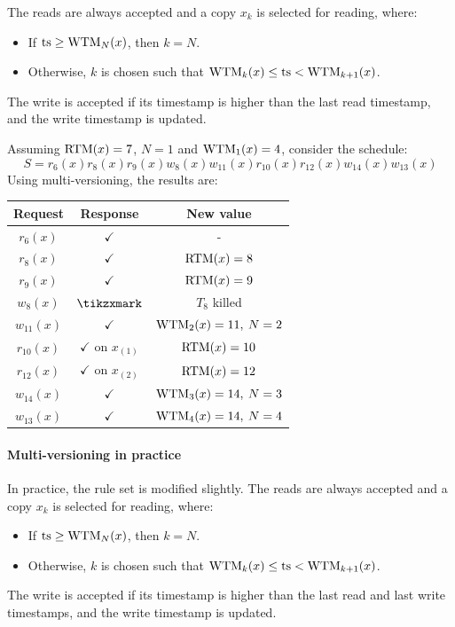 The reads are always accepted and a copy $x_k$ is selected for reading, where:
\begin{itemize}
    \item If $\textnormal{ts} \geq \textnormal{WTM}_N(x)$, then $k=N$.
    \item Otherwise, $k$ is chosen such that $\textnormal{WTM}_k(x) \leq \textnormal{ts} < \textnormal{WTM}_{k+1}(x)$. 
\end{itemize}
The write is accepted if its timestamp is higher than the last read timestamp, and the write timestamp is updated. 

\begin{example}
    Assuming  $\textnormal{RTM}(x)=7$, $N=1$ and $\textnormal{WTM}_1(x)=4$, consider the schedule:
    \[S=r_6(x) r_8(x) r_9(x) w_8(x) w_{11}(x) r_{10}(x) r_{12}(x) w_{14}(x) w_{13}(x)\]
    Using multi-versioning, the results are:
    \begin{table}[H]
        \centering
        \begin{tabular}{ccc}
        \textbf{Request} & \textbf{Response}         & \textbf{New value}  \\ \hline
        $r_6(x)$         & $\checkmark$              & -                   \\
        $r_8(x)$         & $\checkmark$              & $\textnormal{RTM}(x)=8$          \\
        $r_9(x)$         & $\checkmark$              & $\textnormal{RTM}(x)=9$          \\
        $w_8(x)$         & $\tikzxmark$              & $T_8$ killed        \\
        $w_{11}(x)$      & $\checkmark$              & $\textnormal{WTM}_2(x)=11,\:N=2$ \\
        $r_{10}(x)$      & $\checkmark$ on $x_{(1)}$ & $\textnormal{RTM}(x)=10$         \\
        $r_{12}(x)$      & $\checkmark$ on $x_{(2)}$ & $\textnormal{RTM}(x)=12$         \\
        $w_{14}(x)$      & $\checkmark$              & $\textnormal{WTM}_3(x)=14,\:N=3$ \\
        $w_{13}(x)$      & $\checkmark$              & $\textnormal{WTM}_4(x)=14,\:N=4$
        \end{tabular}
    \end{table}
\end{example}

\paragraph*{Multi-versioning in practice}
In practice, the rule set is modified slightly.
The reads are always accepted and a copy $x_k$ is selected for reading, where:
\begin{itemize}
    \item If $\textnormal{ts} \geq \textnormal{WTM}_N(x)$, then $k=N$. 
    \item Otherwise, $k$ is chosen such that $\textnormal{WTM}_k(x) \leq \textnormal{ts} < \textnormal{WTM}_{k+1}(x)$. 
\end{itemize}
The write is accepted if its timestamp is higher than the last read and last write timestamps, and the write timestamp is updated. 

